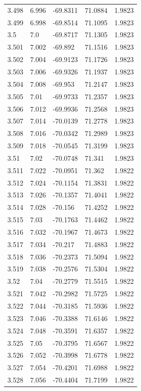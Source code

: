 \begin{tabular}{lllll}
3.498 & 6.996 & -69.8311 & 71.0884 & 1.9823 \\
3.499 & 6.998 & -69.8514 & 71.1095 & 1.9823 \\
3.5 & 7.0 & -69.8717 & 71.1305 & 1.9823 \\
3.501 & 7.002 & -69.892 & 71.1516 & 1.9823 \\
3.502 & 7.004 & -69.9123 & 71.1726 & 1.9823 \\
3.503 & 7.006 & -69.9326 & 71.1937 & 1.9823 \\
3.504 & 7.008 & -69.953 & 71.2147 & 1.9823 \\
3.505 & 7.01 & -69.9733 & 71.2357 & 1.9823 \\
3.506 & 7.012 & -69.9936 & 71.2568 & 1.9823 \\
3.507 & 7.014 & -70.0139 & 71.2778 & 1.9823 \\
3.508 & 7.016 & -70.0342 & 71.2989 & 1.9823 \\
3.509 & 7.018 & -70.0545 & 71.3199 & 1.9823 \\
3.51 & 7.02 & -70.0748 & 71.341 & 1.9823 \\
3.511 & 7.022 & -70.0951 & 71.362 & 1.9822 \\
3.512 & 7.024 & -70.1154 & 71.3831 & 1.9822 \\
3.513 & 7.026 & -70.1357 & 71.4041 & 1.9822 \\
3.514 & 7.028 & -70.156 & 71.4252 & 1.9822 \\
3.515 & 7.03 & -70.1763 & 71.4462 & 1.9822 \\
3.516 & 7.032 & -70.1967 & 71.4673 & 1.9822 \\
3.517 & 7.034 & -70.217 & 71.4883 & 1.9822 \\
3.518 & 7.036 & -70.2373 & 71.5094 & 1.9822 \\
3.519 & 7.038 & -70.2576 & 71.5304 & 1.9822 \\
3.52 & 7.04 & -70.2779 & 71.5515 & 1.9822 \\
3.521 & 7.042 & -70.2982 & 71.5725 & 1.9822 \\
3.522 & 7.044 & -70.3185 & 71.5936 & 1.9822 \\
3.523 & 7.046 & -70.3388 & 71.6146 & 1.9822 \\
3.524 & 7.048 & -70.3591 & 71.6357 & 1.9822 \\
3.525 & 7.05 & -70.3795 & 71.6567 & 1.9822 \\
3.526 & 7.052 & -70.3998 & 71.6778 & 1.9822 \\
3.527 & 7.054 & -70.4201 & 71.6988 & 1.9822 \\
3.528 & 7.056 & -70.4404 & 71.7199 & 1.9822 \\

\end{tabular}
